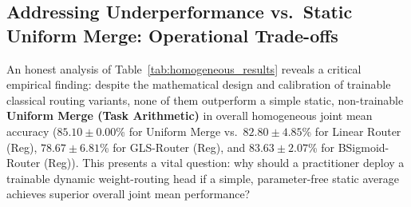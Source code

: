 \subsection{Addressing Underperformance vs.\ Static Uniform Merge: Operational Trade-offs}
\label{sec:tradeoffs}
An honest analysis of Table~\ref{tab:homogeneous_results} reveals a critical empirical finding: despite the mathematical design and calibration of trainable classical routing variants, none of them outperform a simple static, non-trainable \textbf{Uniform Merge (Task Arithmetic)} in overall homogeneous joint mean accuracy ($85.10 \pm 0.00$\% for Uniform Merge vs.\ $82.80 \pm 4.85$\% for Linear Router (Reg), $78.67 \pm 6.81$\% for GLS-Router (Reg), and $83.63 \pm 2.07$\% for BSigmoid-Router (Reg)). This presents a vital question: why should a practitioner deploy a trainable dynamic weight-routing head if a simple, parameter-free static average achieves superior overall joint mean performance?

